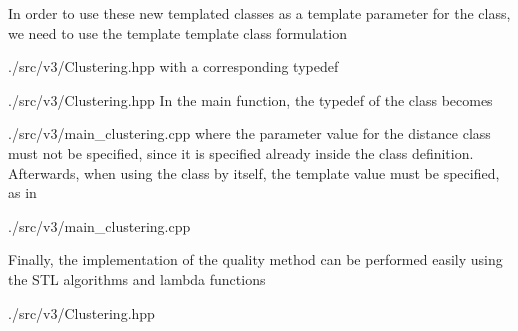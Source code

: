 In order to use these new templated classes as a template parameter for the
 class, we need to use the template template class formulation
%
\lstset{basicstyle=\scriptsize\sf}
    
    {./src/v3/Clustering.hpp}
\lstset{basicstyle=\sf}
%
with a corresponding typedef
%
\lstset{basicstyle=\scriptsize\sf}
    
    {./src/v3/Clustering.hpp}
\lstset{basicstyle=\sf}
%
In the main function, the typedef of the  class becomes
%
\lstset{basicstyle=\scriptsize\sf}
    
    {./src/v3/main_clustering.cpp}
\lstset{basicstyle=\sf}
%
where the parameter value for the distance class must not be specified, since it
is specified already inside the  class definition. Afterwards,
when using the class  by itself, the template value
must be specified, as in
%
\lstset{basicstyle=\scriptsize\sf}
    
    {./src/v3/main_clustering.cpp}
\lstset{basicstyle=\sf}
%

Finally, the implementation of the quality method can be performed easily using
the STL algorithms and lambda functions
%
\lstset{basicstyle=\scriptsize\sf}
    
    {./src/v3/Clustering.hpp}
\lstset{basicstyle=\sf}
%

